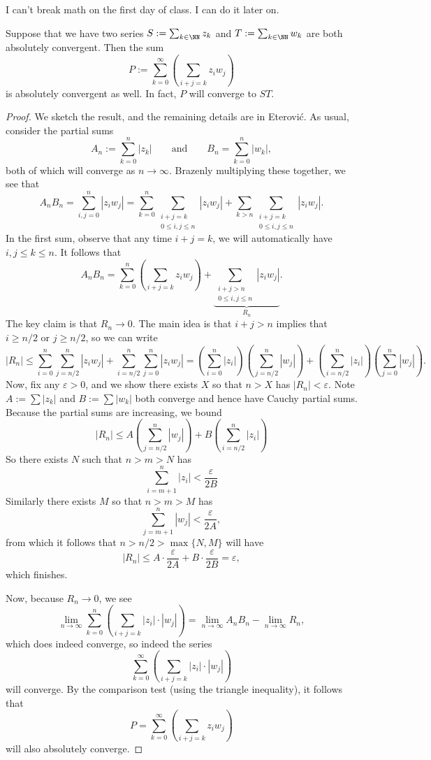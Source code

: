 \begin{quot}
	I can't break math on the first day of class. I can do it later on.
\end{quot}
\begin{lemma}
	Suppose that we have two series $S:=\sum_{k\in\NN}z_k$ and $T:=\sum_{k\in\NN}w_k$ are both absolutely convergent. Then the sum
	\[P:=\sum_{k=0}^\infty\left(\sum_{i+j=k}z_iw_j\right)\]
	is absolutely convergent as well. In fact, $P$ will converge to $ST$.
\end{lemma}
\begin{proof}
	We sketch the result, and the remaining details are in Eterovi\'c. As usual, consider the partial sums
	\[A_n:=\sum_{k=0}^n|z_k|\qquad\text{and}\qquad B_n=\sum_{k=0}^n|w_k|,\]
	both of which will converge as $n\to\infty$. Brazenly multiplying these together, we see that
	\[A_nB_n=\sum_{i,j=0}^n|z_iw_j|=\sum_{k=0}^n\sum_{\substack{i+j=k\\0\le i,j\le n}}|z_iw_j|+\sum_{k>n}\sum_{\substack{i+j=k\\0\le i,j\le n}}|z_iw_j|.\]
	In the first sum, observe that any time $i+j=k$, we will automatically have $i,j\le k\le n$. It follows that
	\[A_nB_n=\sum_{k=0}^n\left(\sum_{i+j=k}z_iw_j\right)+\underbrace{\sum_{\substack{i+j>n\\0\le i,j\le n}}|z_iw_j|}_{R_n}.\]
	The key claim is that $R_n\to0$. The main idea is that $i+j>n$ implies that $i\ge n/2$ or $j\ge n/2$, so we can write
	\[|R_n|\le\sum_{i=0}^n\sum_{j=n/2}^n|z_iw_j|+\sum_{i=n/2}^n\sum_{j=0}^n|z_iw_j|=\left(\sum_{i=0}^n|z_i|\right)\left(\sum_{j=n/2}^n|w_j|\right)+\left(\sum_{i=n/2}^n|z_i|\right)\left(\sum_{j=0}^n|w_j|\right).\]
	Now, fix any $\varepsilon>0$, and we show there exists $X$ so that $n>X$ has $|R_n|<\varepsilon$. Note $A:=\sum|z_k|$ and $B:=\sum|w_k|$ both converge and hence have Cauchy partial sums. Because the partial sums are increasing, we bound
	\[|R_n|\le A\left(\sum_{j=n/2}^n|w_j|\right)+B\left(\sum_{i=n/2}^n|z_i|\right)\]
	So there exists $N$ such that $n>m>N$ has
	\[\sum_{i=m+1}^n|z_i|<\frac\varepsilon {2B}\]
	Similarly there exists $M$ so that $n>m>M$ has
	\[\sum_{j=m+1}^n|w_j|<\frac\varepsilon {2A},\]
	from which it follows that $n>n/2>\max\{N,M\}$ will have
	\[|R_n|\le A\cdot\frac\varepsilon {2A}+B\cdot\frac\varepsilon {2B}=\varepsilon,\]
	which finishes.

	Now, because $R_n\to0$, we see
	\[\lim_{n\to\infty}\sum_{k=0}^n\left(\sum_{i+j=k}|z_i|\cdot|w_j|\right)=\lim_{n\to\infty}A_nB_n-\lim_{n\to\infty}R_n,\]
	which does indeed converge, so indeed the series
	\[\sum_{k=0}^\infty\left(\sum_{i+j=k}|z_i|\cdot|w_j|\right)\]
	will converge. By the comparison test (using the triangle inequality), it follows that
	\[P=\sum_{k=0}^\infty\left(\sum_{i+j=k}z_iw_j\right)\]
	will also absolutely converge.


\end{proof}
